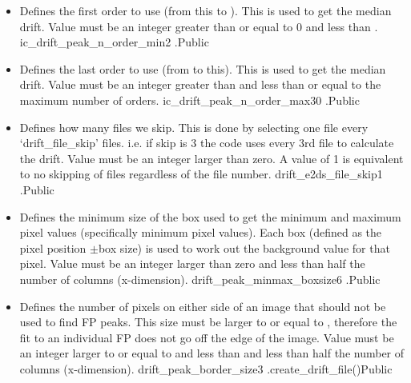 \begin{itemize}

\item \label{text:ic_drift_peak_n_order_min} 
{Defines the first order to use (from this to ). This is used to get the median drift. Value must be an integer greater than or equal to 0 and less than .}
{ic\_drift\_peak\_n\_order\_min}{2}
{\calDRIFTPEAK}{\constantsfile}{\calDRIFTPEAK.\progMAIN}{Public}

\item \label{text:ic_drift_peak_n_order_max} 
{Defines the last order to use (from  to this). This is used to get the median drift. Value must be an integer greater than  and less than or equal to the maximum number of orders.}
{ic\_drift\_peak\_n\_order\_max}{30}
{\calDRIFTPEAK}{\constantsfile}{\calDRIFTPEAK.\progMAIN}{Public}

\item {}
{Defines how many files we skip. This is done by selecting one file every `drift\_file\_skip' files. i.e. if skip is 3 the code uses every 3rd file to calculate the drift. Value must be an integer larger than zero. A value of 1 is equivalent to no skipping of files regardless of the file number.}
{drift\_e2ds\_file\_skip}{1}
{\calDRIFTPEAK}{\constantsfile}{\calDRIFTPEAK.\progMAIN}{Public}

\item {}
{Defines the minimum size of the box used to get the minimum and maximum pixel values (specifically minimum pixel values). Each box (defined as the pixel position $\pm$box size) is used to work out the background value for that pixel. Value must be an integer larger than zero and less than half the number of columns (x-dimension).}
{drift\_peak\_minmax\_boxsize}{6}
{\calDRIFTPEAK}{\constantsfile}{\calDRIFTPEAK.\progMAIN}{Public}

\item \label{text:drift_peak_border_size} 
{Defines the number of pixels on either side of an image that should not be used to find FP peaks. This size must be larger to or equal to , therefore the fit to an individual FP does not go off the edge of the image. Value must be an integer larger to or equal to  and less than and less than half the number of columns (x-dimension).}
{drift\_peak\_border\_size}{3}
{\calDRIFTPEAK}{\constantsfile}{\spirouRV.create\_drift\_file()}{Public}


\end{itemize}
